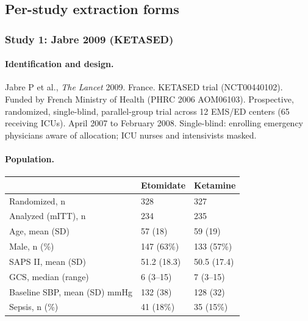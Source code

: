 \documentclass[11pt]{article}
\begin{document}
\newpage

\subsection{Per-study extraction forms}

\subsubsection{Study 1: Jabre 2009 (KETASED)}

\paragraph{Identification and design.}
Jabre P et al., \textit{The Lancet} 2009. France. KETASED trial (NCT00440102). Funded by French Ministry of Health (PHRC 2006 AOM06103). Prospective, randomized, single-blind, parallel-group trial across 12 EMS/ED centers (65 receiving ICUs). April 2007 to February 2008. Single-blind: enrolling emergency physicians aware of allocation; ICU nurses and intensivists masked.

\paragraph{Population.}

\begin{table}[H]
\centering\footnotesize
\begin{tabularx}{\textwidth}{L{4cm} C{3cm} C{3cm}}
\toprule
& \textbf{Etomidate} & \textbf{Ketamine} \\
\midrule
Randomized, n & 328 & 327 \\
Analyzed (mITT), n & 234 & 235 \\
Age, mean (SD) & 57 (18) & 59 (19) \\
Male, n (\%) & 147 (63\%) & 133 (57\%) \\
SAPS II, mean (SD) & 51.2 (18.3) & 50.5 (17.4) \\
GCS, median (range) & 6 (3--15) & 7 (3--15) \\
Baseline SBP, mean (SD) mmHg & 132 (38) & 128 (32) \\
Sepsis, n (\%) & 41 (18\%) & 35 (15\%) \\
\bottomrule
\end{tabularx}
\end{table}
\end{document}

